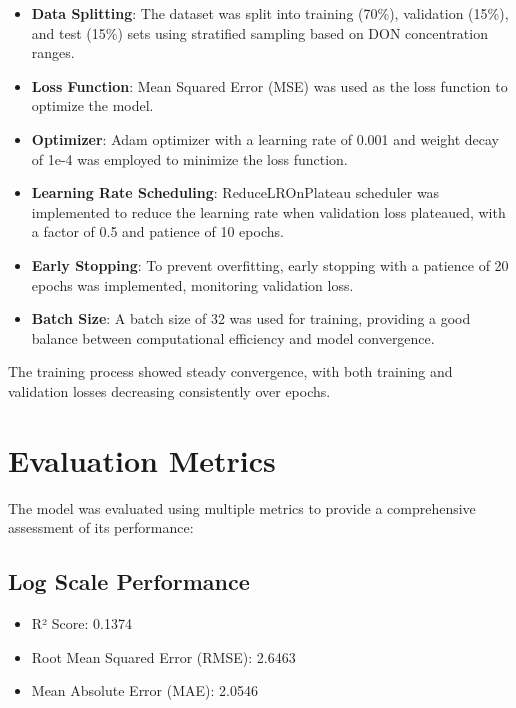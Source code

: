 \documentclass{article}
\begin{document}
\begin{itemize}
    \item \textbf{Data Splitting}: The dataset was split into training (70\%), validation (15\%), and test (15\%) sets using stratified sampling based on DON concentration ranges.
    
    \item \textbf{Loss Function}: Mean Squared Error (MSE) was used as the loss function to optimize the model.
    
    \item \textbf{Optimizer}: Adam optimizer with a learning rate of 0.001 and weight decay of 1e-4 was employed to minimize the loss function.
    
    \item \textbf{Learning Rate Scheduling}: ReduceLROnPlateau scheduler was implemented to reduce the learning rate when validation loss plateaued, with a factor of 0.5 and patience of 10 epochs.
    
    \item \textbf{Early Stopping}: To prevent overfitting, early stopping with a patience of 20 epochs was implemented, monitoring validation loss.
    
    \item \textbf{Batch Size}: A batch size of 32 was used for training, providing a good balance between computational efficiency and model convergence.
\end{itemize}

The training process showed steady convergence, with both training and validation losses decreasing consistently over epochs.

\section{Evaluation Metrics}
The model was evaluated using multiple metrics to provide a comprehensive assessment of its performance:

\subsection{Log Scale Performance}
\begin{itemize}
    \item R² Score: 0.1374
    \item Root Mean Squared Error (RMSE): 2.6463
    \item Mean Absolute Error (MAE): 2.0546
\end{itemize}
\end{document}
